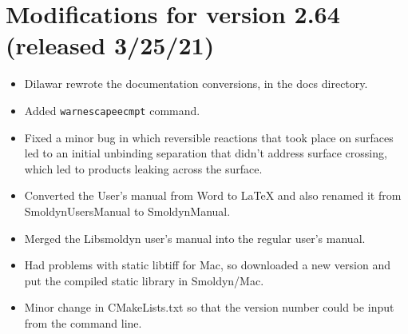 \documentclass {scrbook}
\newcommand {\ttt} {\texttt}
\begin{document}
\section{Modifications for version 2.64 (released 3/25/21)}
\begin{itemize}
\item Dilawar rewrote the documentation conversions, in the docs directory.
\item Added \ttt{warnescapeecmpt} command.
\item Fixed a minor bug in which reversible reactions that took place on surfaces led to an initial unbinding separation that didn't address surface crossing, which led to products leaking across the surface.
\item Converted the User's manual from Word to LaTeX and also renamed it from SmoldynUsersManual to SmoldynManual.
\item Merged the Libsmoldyn user's manual into the regular user's manual.
\item Had problems with static libtiff for Mac, so downloaded a new version and put the compiled static library in Smoldyn/Mac.
\item Minor change in CMakeLists.txt so that the version number could be input from the command line.
\end{itemize}
\end{document}
